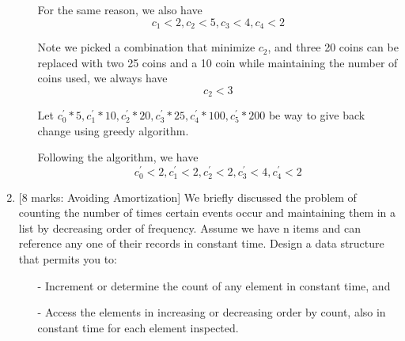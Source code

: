 \documentclass[12pt]{article}
\begin{document}
\begin{enumerate}
\begin{itemize}
For the same reason, we also have
\begin{equation}
c_{1} < 2, c_{2} < 5, c_{3} < 4, c_{4} < 2
\end{equation}

Note we picked a combination that minimize $c_{2}$, and three 20 coins can be replaced with two 25 coins and a 10 coin while maintaining the number of coins used, we always have
\begin{equation}
c_{2} < 3
\end{equation}

Let
$c_{0}^{'} * 5, c_{1}^{'} * 10, c_{2}^{'} * 20, c_{3}^{'} * 25, c_{4}^{'} * 100, c_{5}^{'} * 200$
be way to give back change using greedy algorithm.

Following the algorithm, we have
\begin{equation}
c_{0}^{'} < 2, c_{1}^{'} < 2, c_{2}^{'} < 2, c_{3}^{'} < 4, c_{4}^{'} < 2
\end{equation}


\end{itemize}

\medskip

\item{} [8 marks: Avoiding Amortization]
We briefly discussed the problem of counting the number of times certain events occur and maintaining them in a list by decreasing order of frequency. Assume we have n items and can reference any one of their records in constant time. Design a data structure that permits you to:
\begin{itemize}

\item[-] Increment or determine the count of any element in constant time, and

\item[-] Access the elements in increasing or decreasing order by count, also in constant time for each element inspected.

\end{itemize}

\end{enumerate}
\end{document}
